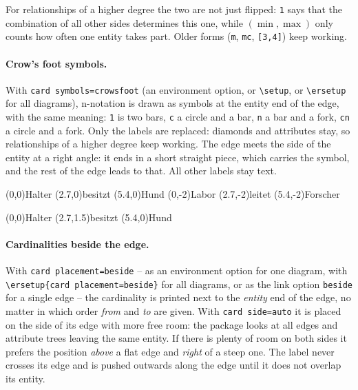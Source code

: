 \documentclass[10pt,a4paper]{article}
\newcommand\cs[1]{\texttt{\textbackslash#1}}
\newcommand\meta[1]{\textlangle\textit{#1}\textrangle}
\begin{document}
For relationships of a higher degree the two are not just flipped: \texttt{1} says
that the combination of all other sides determines this one, while $(\min,\max)$ only
counts how often one entity takes part. Older forms (\texttt{m}, \texttt{mc},
\texttt{[3,4]}) keep working.

\paragraph{Crow's foot symbols.} With \texttt{card symbols=crowsfoot} (an environment
option, or \cs{setup}, or \cs{ersetup} for all diagrams), n-notation is drawn as symbols at the
entity end of the edge, with the same meaning: \texttt{1} is two bars, \texttt{c} a circle and
a bar, \texttt{n} a bar and a fork, \texttt{cn} a circle and a fork. Only the labels are replaced:
diamonds and attributes stay, so relationships of a higher degree keep working. The edge
meets the side of the entity at a right angle: it ends in a short straight piece, which carries
the symbol, and the rest of the edge leads to that. All other labels stay text.

\begin{example}
\begin{erdiagram}[card symbols=crowsfoot]
  (0,0){Halter}
  (2.7,0){besitzt}
  (5.4,0){Hund}
  (0,-2){Labor}
  (2.7,-2){leitet}
  (5.4,-2){Forscher}
\end{erdiagram}
\end{example}

\begin{example}
\begin{erdiagram}[card symbols=crowsfoot]
  (0,0){Halter}
  (2.7,1.5){besitzt}
  (5.4,0){Hund}
\end{erdiagram}
\end{example}

\paragraph{Cardinalities beside the edge.} With
\texttt{card placement=beside} -- as an environment option for one
diagram, with \verb|\ersetup{card placement=beside}| for all diagrams,
or as the link option \texttt{beside} for a single edge -- the
cardinality is printed next to the \emph{entity} end of the edge, no matter in which order \meta{from} and \meta{to}
are given. With \texttt{card side=auto} it is placed on the side of its
edge with more free room: the package looks at all edges and attribute
trees leaving the same entity. If there is plenty of room on both sides
it prefers the position \emph{above} a flat edge and \emph{right} of a
steep one. The label never crosses its edge and is pushed outwards along
the edge until it does not overlap its entity.
\end{document}
